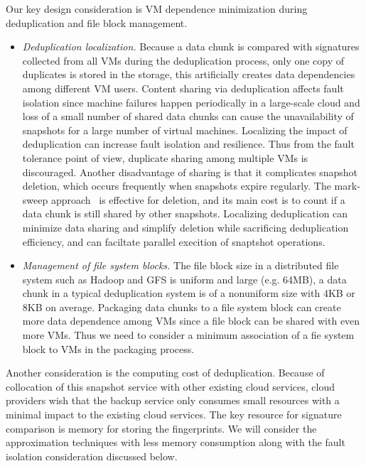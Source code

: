 Our key design consideration is VM dependence minimization during deduplication and file block management.
\begin{itemize}
\item {\em Deduplication localization.}
Because a data chunk is compared with signatures collected from all VMs during
the deduplication process, only one copy of duplicates is stored in the storage,
this artificially creates data dependencies among different VM users. 
Content sharing via deduplication affects fault isolation since machine failures happen periodically 
in a large-scale cloud and
loss of a small number of shared data chunks can 
cause the unavailability of snapshots for a large number of virtual machines.
Localizing the impact of deduplication can increase fault isolation and resilience.
Thus from the fault tolerance point of view,  duplicate sharing among multiple VMs is 
discouraged. 
Another disadvantage of sharing is that it complicates snapshot deletion, 
which  occurs frequently when snapshots expire regularly. 
The mark-sweep approach~\cite{Guo2011} is effective for deletion, and its main cost
is to count if a data chunk is still shared by other snapshots.
Localizing deduplication can  minimize data sharing and simplify deletion while sacrificing 
deduplication efficiency, and  can faciltate parallel execition of snaptshot operations.
\item{\em  Management of file system blocks.}
The file block size in a distributed file system such as  Hadoop and GFS is uniform and large (e.g.  64MB),
 a data chunk in a typical deduplication system is of a nonuniform size with 4KB or 8KB on average.
Packaging data chunks to a file system block can create more data dependence among VMs
since a file block can be shared with even more VMs.
Thus we need to consider a minimum association of a fie system block to VMs in the packaging process.
\end{itemize}

Another consideration is the computing cost of deduplication.
Because of collocation of this snapshot service with other existing cloud services, 
cloud providers wish that the backup service only consumes  small resources
with a minimal impact to the existing cloud services.
The key resource for signature comparison  is memory for storing the fingerprints. 
We will consider the approximation techniques with less memory consumption along 
with the fault isolation consideration discussed below. 

